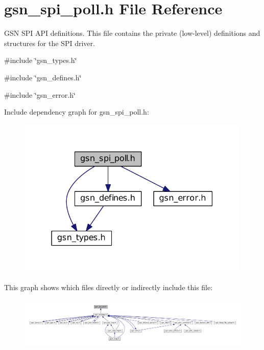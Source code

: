 \hypertarget{a00588}{
\section{gsn\_\-spi\_\-poll.h File Reference}
\label{a00588}
}


GSN SPI API definitions. This file contains the private (low-\/level) definitions and structures for the SPI driver.  


{\ttfamily \#include \char`\"{}gsn\_\-types.h\char`\"{}}\par
{\ttfamily \#include \char`\"{}gsn\_\-defines.h\char`\"{}}\par
{\ttfamily \#include \char`\"{}gsn\_\-error.h\char`\"{}}\par
Include dependency graph for gsn\_\-spi\_\-poll.h:
\nopagebreak
\begin{figure}[H]
\begin{center}
\leavevmode
\includegraphics[width=316pt]{a00828}
\end{center}
\end{figure}
This graph shows which files directly or indirectly include this file:
\nopagebreak
\begin{figure}[H]
\begin{center}
\leavevmode
\includegraphics[width=400pt]{a00829}
\end{center}
\end{figure}
